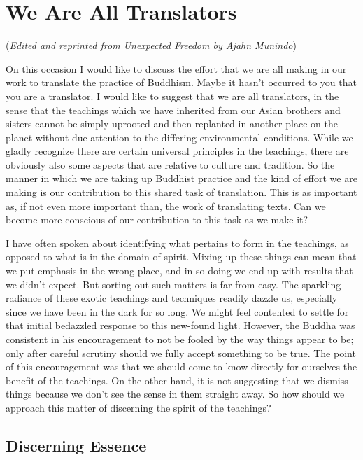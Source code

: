 \chapter{We Are All Translators}

(\emph{Edited and reprinted from \emph{Unexpected Freedom}\cite{unexpected} by Ajahn Munindo})

On this occasion I would like to discuss the effort that we are all
making in our work to translate the practice of Buddhism. Maybe it
hasn't occurred to you that you are a translator. I would like to
suggest that we are all translators, in the sense that the teachings
which we have inherited from our Asian brothers and sisters cannot be
simply uprooted and then replanted in another place on the planet
without due attention to the differing environmental conditions. While
we gladly recognize there are certain universal principles in the
teachings, there are obviously also some aspects that are relative to
culture and tradition. So the manner in which we are taking up Buddhist
practice and the kind of effort we are making is our contribution to
this shared task of translation. This is as important as, if not even
more important than, the work of translating texts. Can we become more
conscious of our contribution to this task as we make it?

I have often spoken about identifying what pertains to form in the
teachings, as opposed to what is in the domain of spirit. Mixing up
these things can mean that we put emphasis in the wrong place, and in so
doing we end up with results that we didn't expect. But sorting out such
matters is far from easy. The sparkling radiance of these exotic
teachings and techniques readily dazzle us, especially since we have
been in the dark for so long. We might feel contented to settle for that
initial bedazzled response to this new-found light. However, the Buddha
was consistent in his encouragement to not be fooled by the way things
appear to be; only after careful scrutiny should we fully accept
something to be true. The point of this encouragement was that we should
come to know directly for ourselves the benefit of the teachings. On the
other hand, it is not suggesting that we dismiss things because we don't
see the sense in them straight away. So how should we approach this
matter of discerning the spirit of the teachings?

\section{Discerning Essence}

